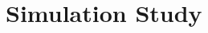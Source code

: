 \documentclass[12pt]{article}
\begin{document}
\begin{example}

\end{example}

\hypertarget{simulation-study}{%
\section{Simulation Study}\label{simulation-study}}



\end{document}
